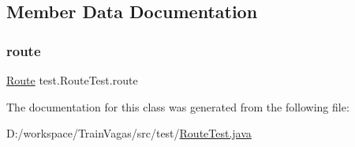 \subsection{Member Data Documentation}
\mbox{\label{classtest_1_1_route_test_ab7d4418426f024512aa3dbdb1a80f605}} 
\subsubsection{\texorpdfstring{route}{route}}
{\footnotesize\ttfamily \hyperlink{classdomain_1_1_route}{Route} test.\+Route\+Test.\+route\hspace{0.3cm}{\ttfamily [package]}}



The documentation for this class was generated from the following file\+:\begin{DoxyCompactItemize}
\item 
D\+:/workspace/\+Train\+Vagas/src/test/\hyperlink{_route_test_8java}{Route\+Test.\+java}\end{DoxyCompactItemize}
